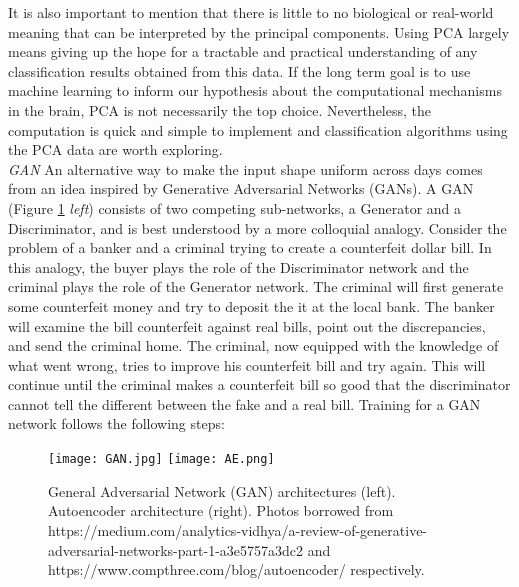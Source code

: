 \documentclass[12pt]{article}
\begin{document}
 \indent It is also important to mention that there is little to no biological or real-world meaning that can be interpreted by the principal components. Using PCA largely means giving up the hope for a tractable and practical understanding of any classification results obtained from this data. If the long term goal is to use machine learning to inform our hypothesis about the computational mechanisms in the brain, PCA is not necessarily the top choice. Nevertheless, the computation is quick and simple to implement and classification algorithms using the PCA data are worth exploring. \\
\indent \textit{GAN} An alternative way to make the input shape uniform across days comes from an idea inspired by Generative Adversarial Networks (GANs). A GAN (Figure \ref{fig:GAN} \textit{left}) consists of two competing sub-networks, a Generator and a Discriminator, and is best understood by a more colloquial analogy. Consider the problem of a banker and a criminal trying to create a counterfeit dollar bill. In this analogy, the buyer plays the role of the Discriminator network and the criminal plays the role of the Generator network. The criminal will first generate some counterfeit money and try to deposit the it at the local bank. The banker will examine the bill counterfeit against real bills, point out the discrepancies, and send the criminal home. The criminal, now equipped with the knowledge of what went wrong, tries to improve his counterfeit bill and try again. This will continue until the criminal makes a counterfeit bill so good that the discriminator cannot tell the different between the fake and a real bill. Training for a GAN network follows the following steps:  \\
\begin{figure}
  \centering
  \texttt{[image: GAN.jpg]}
  \texttt{[image: AE.png]}
  \caption{General Adversarial Network (GAN) architectures (left). Autoencoder architecture (right). Photos borrowed from https://medium.com/analytics-vidhya/a-review-of-generative-adversarial-networks-part-1-a3e5757a3dc2 and  https://www.compthree.com/blog/autoencoder/ respectively.}
  \label{fig:GAN}
\end{figure}
\end{document}
